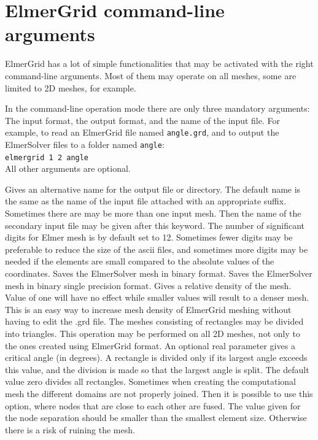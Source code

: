 \section{ElmerGrid command-line arguments}

ElmerGrid has a lot of simple functionalities that may be activated 
with the right command-line arguments. Most of them may operate on
all meshes, some are limited to 2D meshes, for example. 

In the command-line operation mode
there are only three mandatory arguments: The input format,
the output format, and the name of the input file.  For example, 
to read an ElmerGrid file named \texttt{angle.grd}, and to output the
ElmerSolver files to a folder named \texttt{angle}:\\

\texttt{elmergrid 1 2 angle}\\

All other arguments are optional.

\sifbegin
{}
Gives an alternative name for the output file or directory. 
The default name is the same as the name of the input file
attached with an appropriate suffix. 
%
Sometimes there are may be more than one input mesh. 
Then the name of the secondary input file may be given 
after this keyword.
%
The number of significant digits for Elmer mesh is by default set to 12.
Sometimes fewer digits may be preferable to reduce the size of the
ascii files, and sometimes more digits may be needed if the elements are
small compared to the absolute values of the coordinates.
%
Saves the ElmerSolver mesh in binary format.
%
Saves the ElmerSolver mesh in binary single precision format.
%
Gives a relative density of the mesh. Value of one will have no effect
while smaller values will result to a denser mesh. This is an easy way to 
increase mesh density of ElmerGrid meshing without having to edit the .grd file. 
%
The meshes consisting of rectangles may be divided into 
triangles. This operation may be performed on all 2D meshes, 
not only to the ones created using ElmerGrid format.
An optional real parameter gives a critical angle (in degrees).
A rectangle is divided only if its largest angle exceeds this value,
and the division is made so that the largest angle is split.
The default value zero divides all rectangles.
%
Sometimes when creating the computational mesh the 
different domains are not properly joined. Then it is possible to 
use this option, where nodes that are close to each other are
fused. The value given for the node separation should be smaller than
the smallest element size. Otherwise there is a risk of ruining the mesh.

